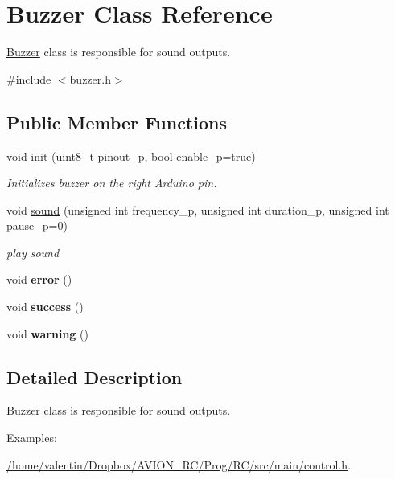 \hypertarget{class_buzzer}{}\section{Buzzer Class Reference}
\label{class_buzzer}


\hyperlink{class_buzzer}{Buzzer} class is responsible for sound outputs.  




{\ttfamily \#include $<$buzzer.\+h$>$}

\subsection*{Public Member Functions}
\begin{DoxyCompactItemize}
\item 
void \hyperlink{class_buzzer_a55547bbb6c553f9a6f7a1d97eea4bf21}{init} (uint8\+\_\+t pinout\+\_\+p, bool enable\+\_\+p=true)
\begin{DoxyCompactList}\small\item\em Initializes buzzer on the right Arduino pin. \end{DoxyCompactList}\item 
void \hyperlink{class_buzzer_a29cb886294e260705b437dea524d43e8}{sound} (unsigned int frequency\+\_\+p, unsigned int duration\+\_\+p, unsigned int pause\+\_\+p=0)
\begin{DoxyCompactList}\small\item\em play sound \end{DoxyCompactList}\item 
\mbox{\label{class_buzzer_a84c33234bf71806d631e1a939d649438}} 
void {\bfseries error} ()
\item 
\mbox{\label{class_buzzer_a9d9c6ae9bd4993d9b34a96c5ae60b5ed}} 
void {\bfseries success} ()
\item 
\mbox{\label{class_buzzer_a90e969d3ca0c6300d7639bf650cf0f79}} 
void {\bfseries warning} ()
\end{DoxyCompactItemize}


\subsection{Detailed Description}
\hyperlink{class_buzzer}{Buzzer} class is responsible for sound outputs. \begin{Desc}
\item[Examples\+: ]\par
\hyperlink{_2home_2valentin_2_dropbox_2_a_v_i_o_n__r_c_2_prog_2_r_c_2src_2main_2control_8h-example}{/home/valentin/\+Dropbox/\+A\+V\+I\+O\+N\+\_\+\+R\+C/\+Prog/\+R\+C/src/main/control.\+h}.\end{Desc}


